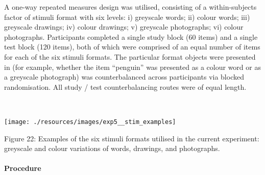 \documentclass[
  11pt,
]{article}
\begin{document}
\hfill\break A one-way repeated measures design was utilised, consisting
of a within-subjects factor of stimuli format with six levels: i)
greyscale words; ii) colour words; iii) greyscale drawings; iv) colour
drawings; v) greyscale photographs; vi) colour photographs. Participants
completed a single study block (60 items) and a single test block (120
items), both of which were comprised of an equal number of items for
each of the six stimuli formats. The particular format objects were
presented in (for example, whether the item ``penguin'' was presented as
a colour word or as a greyscale photograph) was counterbalanced across
participants via blocked randomisation. All study / test
counterbalancing routes were of equal length.

~ ~

\begin{center}\texttt{[image: ./resources/images/exp5\_\_stim\_examples]} \end{center}

Figure 22: Examples of the six stimuli formats utilised in the current
experiment: greyscale and colour variations of words, drawings, and
photographs.

\hypertarget{procedure-4}{%
\paragraph{Procedure}\label{procedure-4}}
\end{document}
